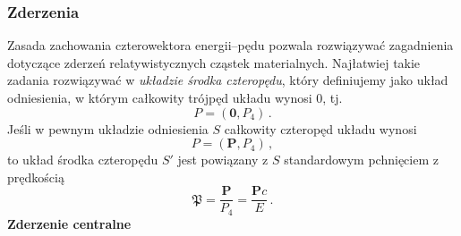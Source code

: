 \documentclass[../main.tex]{subfiles}
\begin{document}
\subsubsection{Zderzenia}
Zasada zachowania czterowektora energii--pędu pozwala rozwiązywać zagadnienia dotyczące zderzeń relatywistycznych cząstek materialnych. Najłatwiej takie zadania rozwiązywać w \textit{układzie środka czteropędu}, który definiujemy jako układ odniesienia, w którym całkowity trójpęd układu wynosi \(0\), tj.
\begin{equation*}
    P=(\mathbf{0},P_4)\,.
\end{equation*}
Jeśli w pewnym układzie odniesienia \(S\) całkowity czteropęd układu wynosi
\begin{equation*}
    P=(\mathbf{P},P_4)\,,
\end{equation*}
to układ środka czteropędu \(S'\) jest powiązany z \(S\) standardowym pchnięciem z prędkością
\begin{equation*}
    \boldsymbol{\mathfrak{P}}=\frac{\mathbf{P}}{P_4}=\frac{\mathbf{P}c}{E}\,.
\end{equation*}
\textbf{Zderzenie centralne}
\medskip
\end{document}
